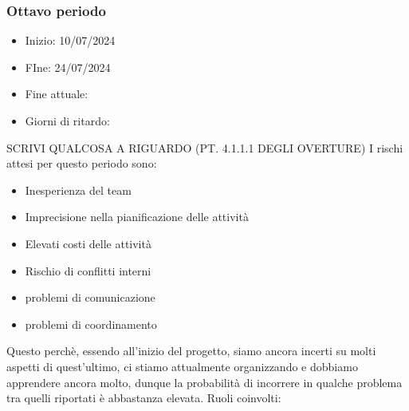 \documentclass[italian,12pt]{article} %
\begin{document}
    \subsubsection{Ottavo periodo}
    \begin{itemize}
        \item Inizio: 10/07/2024
        \item FIne: 24/07/2024
        \item Fine attuale:
        \item Giorni di ritardo:
    \end{itemize}
    SCRIVI QUALCOSA A RIGUARDO (PT. 4.1.1.1 DEGLI OVERTURE)
    I rischi attesi per questo periodo sono:
    \begin{itemize}
        \item Inesperienza del team
        \item Imprecisione nella pianificazione delle attività
        \item Elevati costi delle attività
        \item Rischio di conflitti interni 
        \item problemi di comunicazione
        \item problemi di coordinamento
    \end{itemize}
    Questo perchè, essendo all’inizio del progetto, siamo ancora incerti su molti aspetti di quest’ultimo, ci stiamo attualmente organizzando e dobbiamo apprendere ancora molto, dunque la probabilità di incorrere in qualche problema tra quelli riportati è abbastanza elevata.
    Ruoli coinvolti: 

\end{document}
